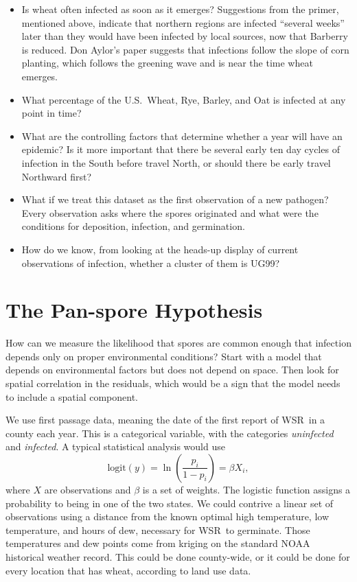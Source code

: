 \documentclass{article}
\newcommand{\wsr}{\textsc{WSR}}
\begin{document}
\begin{itemize}
\item Is wheat often infected as soon as it emerges? Suggestions from the primer, mentioned above, indicate that northern regions are infected ``several weeks'' later than they would have been infected by local sources, now that Barberry is reduced. Don Aylor's paper suggests that infections follow the slope of corn planting, which follows the greening wave and is near the time wheat emerges.

\item What percentage of the U.S.\ Wheat, Rye, Barley, and Oat is infected at any point in time?

\item What are the controlling factors that determine whether a year will have an epidemic? Is it more important that there be several early ten day cycles of infection in the South before travel North, or should there be early travel Northward first?

\item What if we treat this dataset as the first observation of a new pathogen?
Every observation asks where the spores originated and what were the conditions
for deposition, infection, and germination.

\item How do we know, from looking at the heads-up display of current observations of infection,
whether a cluster of them is UG99?

\end{itemize}

\section{The Pan-spore Hypothesis}
How can we measure the likelihood that spores are common enough that infection depends
only on proper environmental conditions? Start with a model that depends on environmental factors
but does not depend on space. Then look for spatial correlation in the residuals, which would be a sign
that the model needs to include a spatial component.

We use first passage data, meaning the date of the first report of \wsr\ in a county each year.
This is a categorical variable, with the categories \textit{uninfected} and \textit{infected}.
A typical statistical analysis would use
\begin{equation}
	\mbox{logit}(y) = \ln\left(\frac{p_i}{1-p_i}\right) = \beta X_i,
\end{equation}
where $X$ are observations and $\beta$ is a set of weights. The logistic function assigns a probability to being in one of the two states. We could contrive a linear set of observations using a distance from the known optimal high temperature, low temperature, and hours of dew, necessary for \wsr\ to germinate. Those temperatures and dew points come from kriging on the standard NOAA historical weather record. This could be done county-wide, or it could be done for every location that has wheat, according to land use data.
\end{document}

